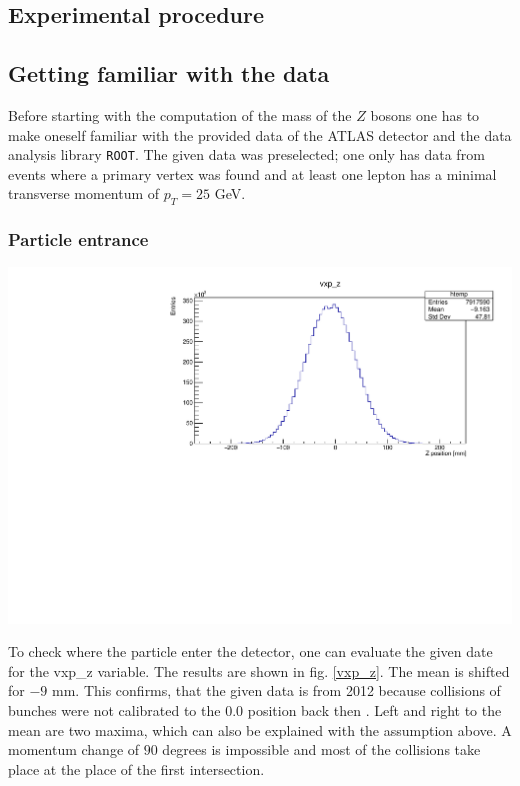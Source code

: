 \documentclass[12pt, a4paper, bibliography=totoc]{scrartcl}
\begin{document}
\begin{multicols}{2}
\section{Experimental procedure}

\subsection{Getting familiar with the data}
Before starting with the computation of the mass of the $Z$ bosons one has to make oneself familiar with the provided data of the ATLAS detector and the data analysis library \verb*+ROOT+.
The given data was preselected; one only has data from events where a primary vertex was found and at least one lepton has a minimal transverse momentum of $p_{T} = 25$ \si{GeV}.

\subsubsection{Particle entrance}
\begin{center}
	\includegraphics[width=\linewidth]{fig/vxp_z_redo.pdf}
	\label{vxp_z}
\end{center}
To check where the particle enter the detector, one can evaluate the given date for the vxp\_z variable. 
The results are shown in fig. \ref{vxp_z}.
The mean is shifted for $-9$ \si{mm}. 
This confirms, that the given data is from 2012 because collisions of bunches were not calibrated to the $0.0$ position back then \cite{atlasbeamspot}.
Left and right to the mean are two maxima, which can also be explained with the assumption above. 
A momentum change of $90$ degrees is impossible and most of the collisions take place at the place of the first intersection.


\end{multicols}
\end{document}

